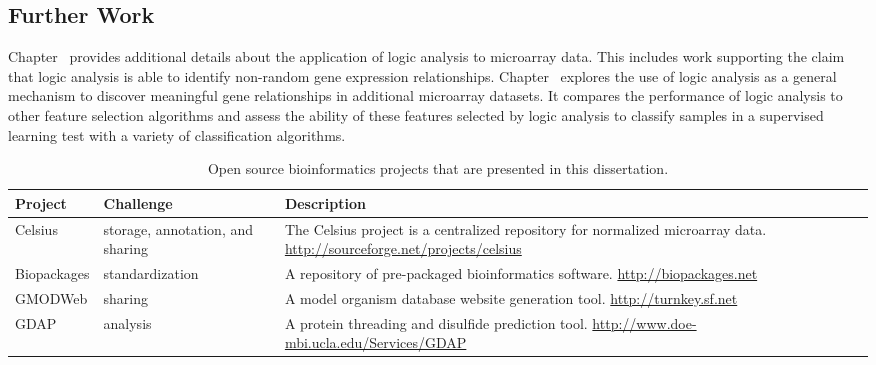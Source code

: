 {\subsection{Further Work}

Chapter \XXXchapter\ provides additional details about the application
of logic analysis to microarray data.  This includes work supporting the claim
that logic analysis is able to identify non-random gene expression
relationships.  Chapter \XXXchapter\ explores the use of logic analysis
as a general mechanism to discover meaningful gene relationships in additional
microarray datasets.  It compares the performance of logic analysis to other
feature selection algorithms and assess the ability of these features selected by
logic analysis to classify samples in a supervised learning test with a variety
of classification algorithms.





\newpage



\begin{table}[p]
\caption[Open source bioinformatics projects]{Open source bioinformatics projects that are presented in this dissertation.}
\label{projects}
\begin{tabular}{|l|p{3cm}|p{7cm}|}
\hline
\textbf{Project} & \textbf{Challenge} & \textbf{Description} \\
\hline
\hline
Celsius & storage, annotation, and sharing  & The Celsius project is a centralized repository for normalized microarray data. \url{http://sourceforge.net/projects/celsius} \\
Biopackages & standardization & A repository of pre-packaged bioinformatics software. \url{http://biopackages.net} \\
GMODWeb & sharing & A model organism database website generation tool. \url{http://turnkey.sf.net} \\
GDAP & analysis & A protein threading and disulfide prediction tool. \url{http://www.doe-mbi.ucla.edu/Services/GDAP}\\
\hline
\end{tabular}
\end{table}

\clearpage



}
